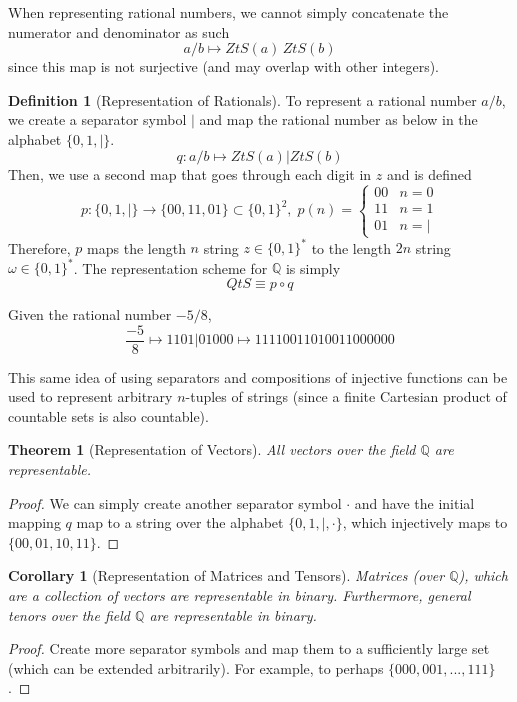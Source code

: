 \documentclass[a4paper, 12pt]{report}
\newtheorem{theorem}{Theorem}[section]
\newtheorem{corollary}{Corollary}[theorem]
\theoremstyle{remark}
\theoremstyle{definition}
\newtheorem{definition}{Definition}[section]
\begin{document}
When representing rational numbers, we cannot simply concatenate the numerator and denominator as such
\[a/b \mapsto ZtS(a) \, ZtS(b)\]
since this map is not surjective (and may overlap with other integers). 

\begin{definition}[Representation of Rationals]
To represent a rational number $a/b$, we create a separator symbol $|$ and map the rational number as below in the alphabet $\{0, 1, |\}$. 
\[q: a/b \mapsto ZtS(a) | ZtS(b)\]
Then, we use a second map that goes through each digit in $z$ and is defined 
\[p: \{0, 1, |\} \longrightarrow \{00,11,01\} \subset \{0, 1\}^2, \; p(n) = \begin{cases}
00 & n = 0 \\
11 & n = 1 \\
01 & n = |
\end{cases}\]
Therefore, $p$ maps the length $n$ string $z \in \{0, 1\}^*$ to the length $2n$ string $\omega \in \{0, 1\}^*$. The representation scheme for $\mathbb{Q}$ is simply 
\[QtS \equiv p \circ q\]
\end{definition}

\begin{example}
Given the rational number $-5/8$,
\[\frac{-5}{8} \mapsto 1101|01000 \mapsto 11110011010011000000\]
\end{example}

This same idea of using separators and compositions of injective functions can be used to represent arbitrary $n$-tuples of strings (since a finite Cartesian product of countable sets is also countable). 

\begin{theorem}[Representation of Vectors]
All vectors over the field $\mathbb{Q}$ are representable. 
\end{theorem}
\begin{proof}
We can simply create another separator symbol $\cdot$ and have the initial mapping $q$ map to a string over the alphabet $\{0, 1, |, \cdot\}$, which injectively maps to $\{00, 01, 10, 11\}$. 
\end{proof}

\begin{corollary}[Representation of Matrices and Tensors]
Matrices (over $\mathbb{Q}$), which are a collection of vectors are representable in binary. Furthermore, general tenors over the field $\mathbb{Q}$ are representable in binary. 
\end{corollary}
\begin{proof}
Create more separator symbols and map them to a sufficiently large set (which can be extended arbitrarily). For example, to perhaps $\{000, 001, ..., 111\}$. 
\end{proof}
\end{document}
